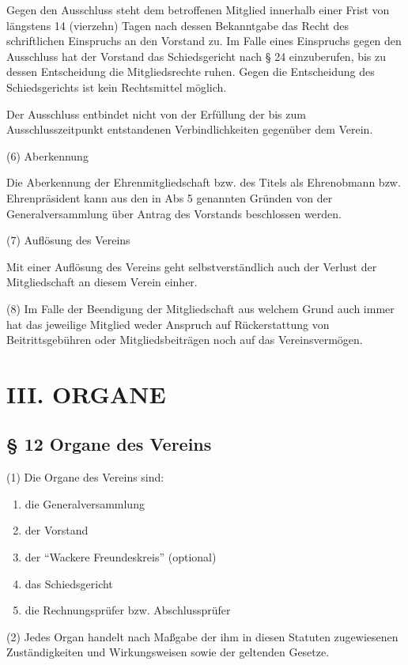 \documentclass[11pt,a4paper]{article}
\begin{document}
Gegen den Ausschluss steht dem betroffenen Mitglied innerhalb einer Frist von längstens 14 (vierzehn) Tagen nach dessen Bekanntgabe das Recht des schriftlichen Einspruchs an den Vorstand zu.
Im Falle eines Einspruchs gegen den Ausschluss hat der Vorstand das Schiedsgericht nach § 24 einzuberufen, bis zu dessen Entscheidung die Mitgliedsrechte ruhen.
Gegen die Entscheidung des Schiedsgerichts ist kein Rechtsmittel möglich.

Der Ausschluss entbindet nicht von der Erfüllung der bis zum Ausschlusszeitpunkt entstandenen Verbindlichkeiten gegenüber dem Verein.

(6)
Aberkennung

Die Aberkennung der Ehrenmitgliedschaft bzw. des Titels als Ehrenobmann bzw. Ehrenpräsident kann aus den in Abs 5 genannten Gründen von der Generalversammlung über Antrag des Vorstands beschlossen werden.

(7)
Auflösung des Vereins

Mit einer Auflösung des Vereins geht selbstverständlich auch der Verlust der Mitgliedschaft an diesem Verein einher.

(8)
Im Falle der Beendigung der Mitgliedschaft aus welchem Grund auch immer hat das jeweilige Mitglied weder Anspruch auf Rückerstattung von Beitrittsgebühren oder Mitgliedsbeiträgen noch auf das Vereinsvermögen.

\section{III. ORGANE}

\subsection{§ 12
Organe des Vereins}

(1)
Die Organe des Vereins sind:

\begin{enumerate}[label=\alph*)]
\item
die Generalversammlung
\item
der Vorstand
\item
der "`Wackere Freundeskreis"' (optional)
\item
das Schiedsgericht
\item
die Rechnungsprüfer bzw. Abschlussprüfer
\end{enumerate}

(2)
Jedes Organ handelt nach Maßgabe der ihm in diesen Statuten zugewiesenen Zuständigkeiten und Wirkungsweisen sowie der geltenden Gesetze.
\end{document}
